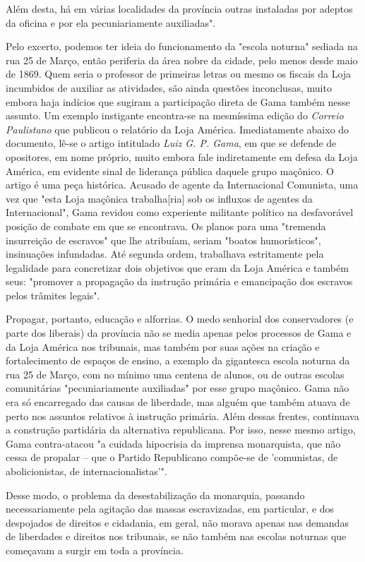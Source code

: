 Além desta, há em várias localidades da província outras instaladas por
adeptos da oficina e por ela pecuniariamente auxiliadas".

Pelo excerto, podemos ter ideia do funcionamento da "escola noturna"
sediada na rua 25 de Março, então periferia da área nobre da cidade,
pelo menos desde maio de 1869. Quem seria o professor de primeiras
letras ou mesmo os fiscais da Loja incumbidos de auxiliar as atividades,
são ainda questões inconclusas, muito embora haja indícios que sugiram a
participação direta de Gama também nesse assunto. Um exemplo instigante
encontra-se na mesmíssima edição do \emph{Correio Paulistano} que
publicou o relatório da Loja América. Imediatamente abaixo do documento,
lê-se o artigo intitulado \emph{Luiz G. P. Gama}, em que se defende de
opositores, em nome próprio, muito embora fale indiretamente em defesa
da Loja América, em evidente sinal de liderança pública daquele grupo
maçônico. O artigo é uma peça histórica. Acusado de agente da
Internacional Comunista, uma vez que "esta Loja maçônica
trabalha{[}ria{]} sob os influxos de agentes da Internacional", Gama
revidou como experiente militante político na desfavorável posição de
combate em que se encontrava. Os planos para uma "tremenda insurreição
de escravos" que lhe atribuíam, seriam "boatos humorísticos",
insinuações infundadas. Até segunda ordem, trabalhava estritamente pela
legalidade para concretizar dois objetivos que eram da Loja América e
também seus: "promover a propagação da instrução primária e emancipação
dos escravos pelos trâmites legais".

Propagar, portanto, educação e alforrias. O medo senhorial dos
conservadores (e parte dos liberais) da província não se media apenas
pelos processos de Gama e da Loja América nos tribunais, mas também por
suas ações na criação e fortalecimento de espaços de ensino, a exemplo
da gigantesca escola noturna da rua 25 de Março, com no mínimo uma
centena de alunos, ou de outras escolas comunitárias "pecuniariamente
auxiliadas" por esse grupo maçônico. Gama não era só encarregado das
causas de liberdade, mas alguém que também atuava de perto nos assuntos
relativos à instrução primária. Além dessas frentes, continuava a
construção partidária da alternativa republicana. Por isso, nesse mesmo
artigo, Gama contra-atacou "a cuidada hipocrisia da imprensa
monarquista, que não cessa de propalar -- que o Partido Republicano
compõe-se de 'comunistas, de abolicionistas, de internacionalistas'".

Desse modo, o problema da desestabilização da monarquia, passando
necessariamente pela agitação das massas escravizadas, em particular, e
dos despojados de direitos e cidadania, em geral, não morava apenas nas
demandas de liberdades e direitos nos tribunais, se não também nas
escolas noturnas que começavam a surgir em toda a província.


